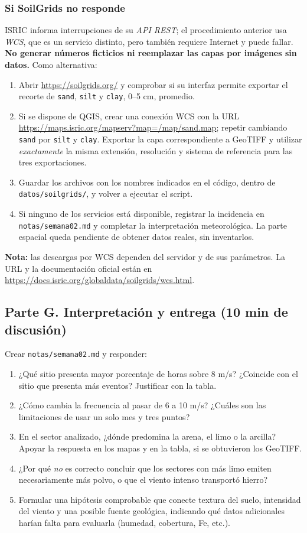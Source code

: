 \documentclass[11pt,a4paper]{article}
\begin{document}
\subsubsection*{Si SoilGrids no responde}
ISRIC informa interrupciones de su \emph{API REST}; el procedimiento anterior
usa \emph{WCS}, que es un servicio distinto, pero también requiere Internet y
puede fallar. \textbf{No generar números ficticios ni reemplazar las capas
por imágenes sin datos.} Como alternativa:
\begin{enumerate}[nosep]
\item Abrir \url{https://soilgrids.org/} y comprobar si su interfaz permite
exportar el recorte de \texttt{sand}, \texttt{silt} y \texttt{clay}, 0--5 cm, promedio.
\item Si se dispone de QGIS, crear una conexión WCS con la URL
\url{https://maps.isric.org/mapserv?map=/map/sand.map}; repetir cambiando
\texttt{sand} por \texttt{silt} y \texttt{clay}. Exportar la capa correspondiente
a GeoTIFF y utilizar \emph{exactamente} la misma extensión, resolución y
sistema de referencia para las tres exportaciones.
\item Guardar los archivos con los nombres indicados en el código, dentro de
\texttt{datos/soilgrids/}, y volver a ejecutar el script.
\item Si ninguno de los servicios está disponible, registrar la incidencia
en \texttt{notas/semana02.md} y completar la interpretación meteorológica.
La parte espacial queda pendiente de obtener datos reales, sin inventarlos.
\end{enumerate}

\textbf{Nota:} las descargas por WCS dependen del servidor y de sus parámetros.
La URL y la documentación oficial están en
\url{https://docs.isric.org/globaldata/soilgrids/wcs.html}.

\subsection{Parte G. Interpretación y entrega (10 min de discusión)}
Crear \texttt{notas/semana02.md} y responder:
\begin{enumerate}[label=\arabic*.]
\item ¿Qué sitio presenta mayor porcentaje de horas sobre 8 m/s?
¿Coincide con el sitio que presenta más eventos? Justificar con la tabla.
\item ¿Cómo cambia la frecuencia al pasar de 6 a 10 m/s?
¿Cuáles son las limitaciones de usar un solo mes y tres puntos?
\item En el sector analizado, ¿dónde predomina la arena, el limo o la arcilla?
Apoyar la respuesta en los mapas y en la tabla, si se obtuvieron los GeoTIFF.
\item ¿Por qué \emph{no} es correcto concluir que los sectores con más limo
emiten necesariamente más polvo, o que el viento intenso transportó hierro?
\item Formular una hipótesis comprobable que conecte textura del suelo,
intensidad del viento y una posible fuente geológica, indicando qué datos
adicionales harían falta para evaluarla (humedad, cobertura, Fe, etc.).
\end{enumerate}
\end{document}
